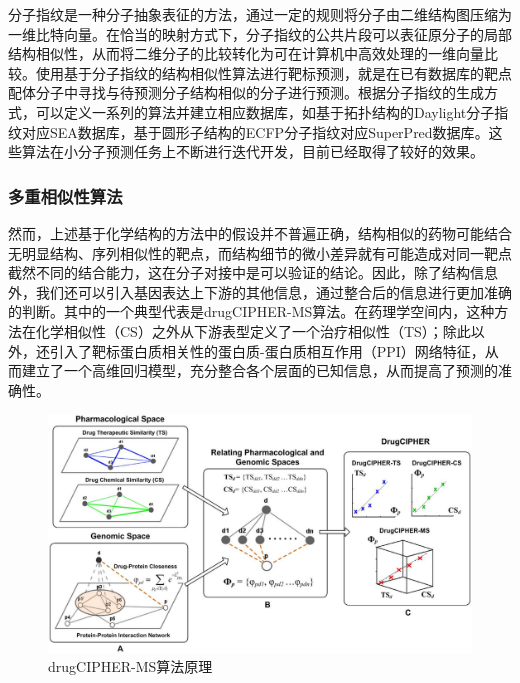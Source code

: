 分子指纹是一种分子抽象表征的方法，通过一定的规则将分子由二维结构图压缩为一维比特向量。在恰当的映射方式下，分子指纹的公共片段可以表征原分子的局部结构相似性，从而将二维分子的比较转化为可在计算机中高效处理的一维向量比较。使用基于分子指纹的结构相似性算法进行靶标预测，就是在已有数据库的靶点配体分子中寻找与待预测分子结构相似的分子进行预测。根据分子指纹的生成方式，可以定义一系列的算法并建立相应数据库，如基于拓扑结构的Daylight分子指纹对应SEA数据库\cite{Keiser_Roth_Armbruster_Ernsberger_Irwin_Shoichet_2007}，基于圆形子结构的ECFP分子指纹对应SuperPred数据库\cite{Nickel_Gohlke_Erehman_Banerjee_Rong_Goede_Dunkel_Preissner_2014}。这些算法在小分子预测任务上不断进行迭代开发，目前已经取得了较好的效果。

\subsubsection{多重相似性算法}

然而，上述基于化学结构的方法中的假设并不普遍正确，结构相似的药物可能结合无明显结构、序列相似性的靶点，而结构细节的微小差异就有可能造成对同一靶点截然不同的结合能力，这在分子对接中是可以验证的结论。因此，除了结构信息外，我们还可以引入基因表达上下游的其他信息，通过整合后的信息进行更加准确的判断。其中的一个典型代表是drugCIPHER-MS算法。在药理学空间内，这种方法在化学相似性（CS）之外从下游表型定义了一个治疗相似性（TS）；除此以外，还引入了靶标蛋白质相关性的蛋白质-蛋白质相互作用（PPI）网络特征，从而建立了一个高维回归模型，充分整合各个层面的已知信息，从而提高了预测的准确性\cite{Zhao_Li_2010}。

\begin{figure}[H]
  \centering
  \includegraphics[width=\linewidth]{figures/drugCIPHER-MS.png}
  \caption{drugCIPHER-MS算法原理\cite{Zhao_Li_2010}}
  \label{fig:drugCIPHER-MS}
\end{figure}

